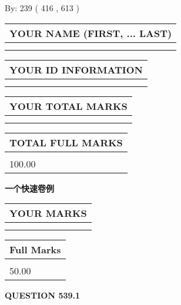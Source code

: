 \documentclass{ctexart}
\begin{document}
   
\hspace{1.0in} By: 
 239 ( 416 ,  613 )
   
   
   
   
\newpage 
\setcounter{page}{ 
   539001 } 
   
   
   
   
\noindent\begin{tabular}{|l|}
\hline
YOUR NAME (FIRST, ... LAST)  \\
\hline
 \\ 
 \\ 
\hline
\end{tabular}
\hspace{0.05in} \begin{tabular}{|l|}
\hline
 YOUR   ID   INFORMATION  \\
\hline
 \\ 
 \\ 
\hline
\end{tabular}
   
   
\vspace{0.2in}\noindent\begin{tabular}{|l|}
\hline
YOUR TOTAL MARKS  \\
\hline
 \\ 
 \\ 
\hline
\end{tabular}
\hspace{0.05in} \begin{tabular}{|l|}
\hline
TOTAL FULL MARKS  \\
\hline
 \\ 
100.00 \\
\hline
\end{tabular}
   
   
 \vspace{0.2in}
{\LARGE {\textbf{ 一个快速卷例}}}
   
   
  
\vspace{0.2in}
  
\noindent\begin{tabular}{|l|}
\hline
 YOUR MARKS  \\
\hline
 \\ 
 \\ 
\hline
\end{tabular}
\hspace{0.05in} \begin{tabular}{|l|}
\hline
 Full Marks  \\
\hline
 \\ 
50.00 \\
\hline
\end{tabular}
{\textbf{\Large{QUESTION
539.1 
}}}
  
\end{document}
